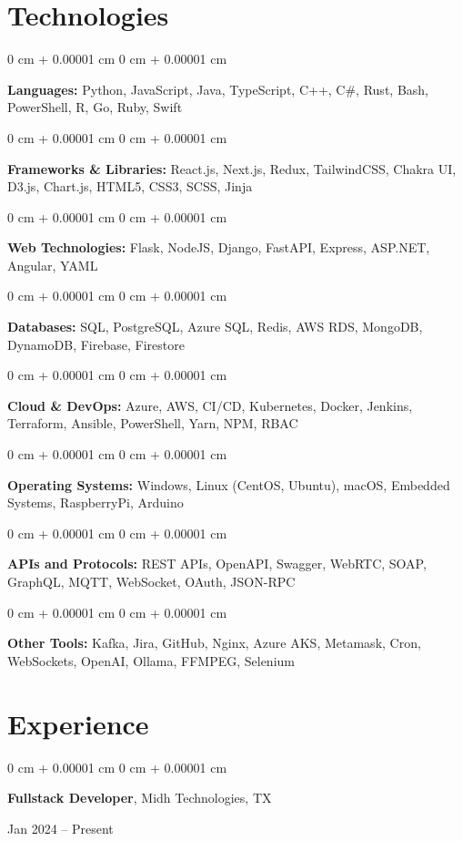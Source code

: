 \documentclass[10pt, letterpaper]{article}
\newenvironment{onecolentry}{
    \begin{adjustwidth}{
        0 cm + 0.00001 cm
    }{
        0 cm + 0.00001 cm
    }
}{
    \end{adjustwidth}
} %
\newenvironment{twocolentry}[2][]{
    \onecolentry
    \def\secondColumn{#2}
    \setcolumnwidth{\fill, 4.5 cm}
    \begin{paracol}{2}
}{
    \switchcolumn \raggedleft \secondColumn
    \end{paracol}
    \endonecolentry
} %
\begin{document}
\section{Technologies}
\begin{onecolentry}
	\textbf{Languages:} Python, JavaScript, Java, TypeScript, C++, C\#, Rust, Bash, PowerShell, R, Go, Ruby, Swift
\end{onecolentry}
\begin{onecolentry}
	\textbf{Frameworks \& Libraries:} React.js, Next.js, Redux, TailwindCSS, Chakra UI, D3.js, Chart.js, HTML5, CSS3, SCSS, Jinja
\end{onecolentry}
\begin{onecolentry}
	\textbf{Web Technologies:} Flask, NodeJS, Django, FastAPI, Express, ASP.NET, Angular, YAML
\end{onecolentry}
\begin{onecolentry}
	\textbf{Databases:} SQL, PostgreSQL, Azure SQL, Redis, AWS RDS, MongoDB, DynamoDB, Firebase, Firestore
\end{onecolentry}
\begin{onecolentry}
	\textbf{Cloud \& DevOps:} Azure, AWS, CI/CD, Kubernetes, Docker, Jenkins, Terraform, Ansible, PowerShell, Yarn, NPM, RBAC
\end{onecolentry}
\begin{onecolentry}
	\textbf{Operating Systems:} Windows, Linux (CentOS, Ubuntu), macOS, Embedded Systems, RaspberryPi, Arduino
\end{onecolentry}
\begin{onecolentry}
	\textbf{APIs and Protocols:} REST APIs, OpenAPI, Swagger, WebRTC, SOAP, GraphQL, MQTT, WebSocket, OAuth, JSON-RPC
\end{onecolentry}
\begin{onecolentry}
	\textbf{Other Tools:} Kafka, Jira, GitHub, Nginx, Azure AKS, Metamask, Cron, WebSockets, OpenAI, Ollama, FFMPEG, Selenium
\end{onecolentry}





\section{Experience}

\begin{twocolentry}{
	Jan 2024 – Present
}
\textbf{Fullstack Developer}, Midh Technologies, TX
\end{twocolentry}
\end{document}

